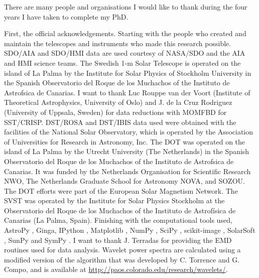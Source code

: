 \begin{acknowledgements}      
    
    There are many people and organisations I would like to thank during the four years I have taken to complete my PhD.
    
    First, the official acknowledgements.
    Starting with the people who created and maintain the telescopes and instruments who made this research possible.
    SDO/AIA and SDO/HMI data are used courtesy of NASA/SDO and the AIA and HMI science teams.
    The Swedish 1-m Solar Telescope is operated on the island of La Palma by the Institute for Solar Physics of Stockholm University in the Spanish Observatorio del Roque de los Muchachos of the Instituto de Astrofsica de Canarias.
    I want to thank Luc Rouppe van der Voort (Institute of Theoretical Astrophysics, University of Oslo) and J. de la Cruz Rodriguez (University of Uppsala, Sweden) for data reductions with MOMFBD for SST/CRISP.
    DST/ROSA and DST/IBIS data used were obtained with the facilities of the National Solar Observatory, which is operated by the Association of Universities for Research in Astronomy, Inc.
    The DOT was operated on the island of La Palma by the Utrecht University (The Netherlands) in the Spanish Observatorio del Roque de los Muchachos of the Instituto de Astrofsica de Canarias.
    It was funded by the Netherlands Organisation for Scientific Research NWO, The Netherlands Graduate School for Astronomy NOVA, and SOZOU.
    The DOT efforts were part of the European Solar Magnetism Network.
    The SVST was operated by the Institute for Solar Physics Stockholm at the Observatorio del Roque de los Muchachos of the Instituto de Astrofísica de Canarias (La Palma, Spain).
    Finishing with the computational tools used, AstroPy \citep{theastropycollaboration2013}, Ginga, IPython \citep{perez2007}, Matplotlib \citep{hunter2007}, NumPy \citep{jones2001}, SciPy \citep{jones2001}, scikit-image \citep{vanderwalt2014}, SolarSoft \citep{1998SoPh..182..497F}, SunPy \citep{thesunpycommunity2015a} and SymPy \cite{sympydevelopmentteam2014}.
    I want to thank J. Terradas for providing the EMD routines used for data analysis.
    Wavelet power spectra are calculated using a modified version of the algorithm that was developed by C. Torrence and G. Compo, and is available at \url{http://paos.colorado.edu/research/wavelets/}.
    

\end{acknowledgements}
